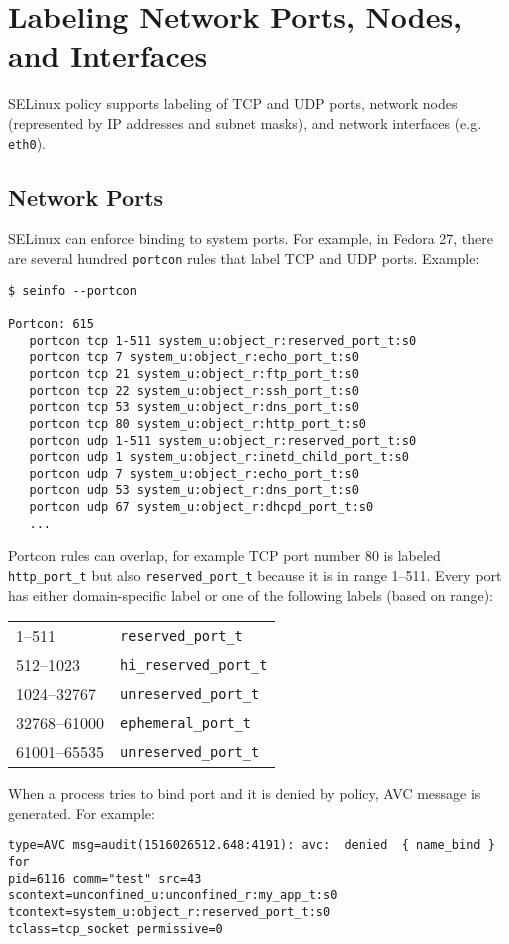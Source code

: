 \section{Labeling Network Ports, Nodes, and Interfaces}
SELinux policy supports labeling of TCP and UDP ports, network nodes
(represented by IP addresses and subnet masks), and network interfaces (e.g.
\texttt{eth0}).

\subsection{Network Ports}
SELinux can enforce binding to system ports. For example, in Fedora 27, there
are several hundred \texttt{portcon} rules that label TCP and UDP ports.
Example:
\begin{lstlisting}
$ seinfo --portcon

Portcon: 615
   portcon tcp 1-511 system_u:object_r:reserved_port_t:s0
   portcon tcp 7 system_u:object_r:echo_port_t:s0
   portcon tcp 21 system_u:object_r:ftp_port_t:s0
   portcon tcp 22 system_u:object_r:ssh_port_t:s0
   portcon tcp 53 system_u:object_r:dns_port_t:s0
   portcon tcp 80 system_u:object_r:http_port_t:s0
   portcon udp 1-511 system_u:object_r:reserved_port_t:s0
   portcon udp 1 system_u:object_r:inetd_child_port_t:s0
   portcon udp 7 system_u:object_r:echo_port_t:s0
   portcon udp 53 system_u:object_r:dns_port_t:s0
   portcon udp 67 system_u:object_r:dhcpd_port_t:s0
   ...
\end{lstlisting}
Portcon rules can overlap, for example TCP port number 80 is labeled
\texttt{http\_port\_t} but also \texttt{reserved\_port\_t} because it is in range
1--511. Every port has either domain-specific label or one of the following
labels (based on range):

\begin{tabular}{l l}
    1--511 & \texttt{reserved\_port\_t} \\
    512--1023 & \texttt{hi\_reserved\_port\_t} \\
    1024--32767 & \texttt{unreserved\_port\_t} \\
    32768--61000 & \texttt{ephemeral\_port\_t} \\
    61001--65535 & \texttt{unreserved\_port\_t} \\
\end{tabular}

When a process tries to bind port and it is denied by policy, AVC message is
generated. For example:
\begin{lstlisting}
type=AVC msg=audit(1516026512.648:4191): avc:  denied  { name_bind } for
pid=6116 comm="test" src=43 scontext=unconfined_u:unconfined_r:my_app_t:s0
tcontext=system_u:object_r:reserved_port_t:s0
tclass=tcp_socket permissive=0
\end{lstlisting}

